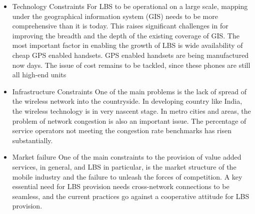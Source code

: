 	\begin{itemize}
	
	
	
	  \item Technology Constraints 
	For LBS to be operational on a large scale, mapping under 
	the geographical information system (GIS) needs to be 
	more comprehensive than it is today. This raises 
	significant challenges in for improving the breadth and the 
	depth of the existing coverage of GIS. The most important 
	factor in enabling the growth of LBS is wide availability of 
	cheap GPS enabled handsets. GPS enabled handsets are 
	being manufactured now days. The issue of cost remains to 
	be tackled, since these phones are still all high-end units
	
	\item Infrastructure Constraints 
	One of the main problems is the lack of spread of the 
	wireless network into the countryside. In developing 
	country like India, the wireless technology is in very 
	nascent stage. In metro cities and areas, the problem of 
	network congestion is also an important issue. The 
	percentage of service operators not meeting the congestion 
	rate benchmarks has risen substantially.
	
	\item Market failure 
	One of the main constraints to the provision of value added 
	services, in general, and LBS in particular, is the market 
	structure of the mobile industry and the failure to unleash 
	the forces of competition. A key essential need for LBS 
	provision needs cross-network connections to be seamless, 
	and the current practices go against a cooperative attitude 
	for LBS provision. 
	
	
	
	\end{itemize}
	
	
	
	
	
	
	
	
	
